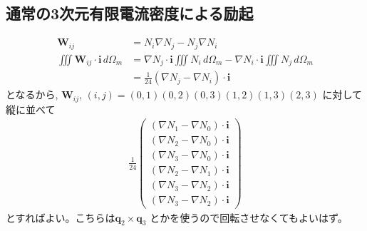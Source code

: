 \subsection{通常の3次元有限電流密度による励起}

\begin{align}
\bm{W}_{ij}&=N_i\nabla N_j-N_j\nabla N_i\\
\iiint\bm{W}_{ij}\cdot\bm{i}\,d\Omega_m
&=\nabla N_j\cdot\bm{i}\iiint N_i\,d\Omega_m
-\nabla N_i\cdot\bm{i}\iiint N_j\,d\Omega_m\\
&=\frac{1}{24}
\left(\nabla N_j-\nabla N_i\right)\cdot\bm{i}
\end{align}
となるから, $\bm{W}_{ij}$,
$\left(i,j\right)=
\left(0,1\right)
\left(0,2\right)
\left(0,3\right)
\left(1,2\right)
\left(1,3\right)
\left(2,3\right)$
に対して縦に並べて
\begin{align}
\frac{1}{24}
\left(
\begin{array}{c}
\left(\nabla N_1-\nabla N_0\right)\cdot\bm{i}\\
\left(\nabla N_2-\nabla N_0\right)\cdot\bm{i}\\
\left(\nabla N_3-\nabla N_0\right)\cdot\bm{i}\\
\left(\nabla N_2-\nabla N_1\right)\cdot\bm{i}\\
\left(\nabla N_3-\nabla N_2\right)\cdot\bm{i}\\
\left(\nabla N_3-\nabla N_2\right)\cdot\bm{i}
\end{array}
\right)
\end{align}
とすればよい。こちらは$\bm{q}_2\times\bm{q}_3$
とかを使うので回転させなくてもよいはず。